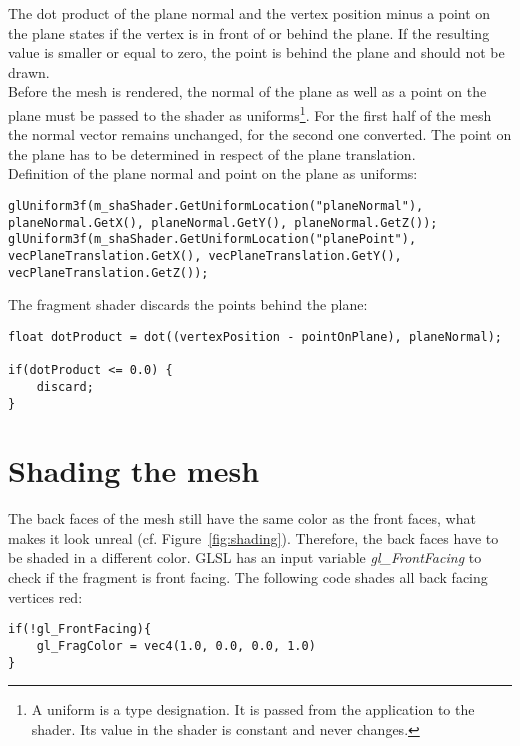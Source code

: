 The dot product of the plane normal and the vertex position minus a point on the plane states if the vertex is in front of or behind the plane.%
If the resulting value is smaller or equal to zero, the point is behind the plane and should not be drawn. \\
\newline
Before the mesh is rendered, the normal of the plane as well as a point on the plane must be passed to the shader as uniforms\footnote{A uniform is a type designation. It is passed from the application to the shader. Its value in the shader is constant and never changes.}. 
For the first half of the mesh the normal vector remains unchanged, for the second one converted. The point on the plane has to be determined in respect of the plane translation.\\
\newline
Definition of the plane normal and point on the plane as uniforms:
\begin{lstlisting}
glUniform3f(m_shaShader.GetUniformLocation("planeNormal"), planeNormal.GetX(), planeNormal.GetY(), planeNormal.GetZ());
glUniform3f(m_shaShader.GetUniformLocation("planePoint"), vecPlaneTranslation.GetX(), vecPlaneTranslation.GetY(), vecPlaneTranslation.GetZ());
\end{lstlisting}

The fragment shader discards the points behind the plane:
\begin{lstlisting}
float dotProduct = dot((vertexPosition - pointOnPlane), planeNormal);
		
if(dotProduct <= 0.0) {
	discard;
}
\end{lstlisting}

\section{Shading the mesh}
The back faces of the mesh still have the same color as the front faces, what makes it look unreal (cf. Figure~\ref{fig:shading}). Therefore, the back faces have to be shaded in a different color. GLSL has an input variable \emph{gl\_FrontFacing} to check if the fragment is front facing. The following code shades all back facing vertices red:
\begin{lstlisting}
if(!gl_FrontFacing){
	gl_FragColor = vec4(1.0, 0.0, 0.0, 1.0)
}
\end{lstlisting}

